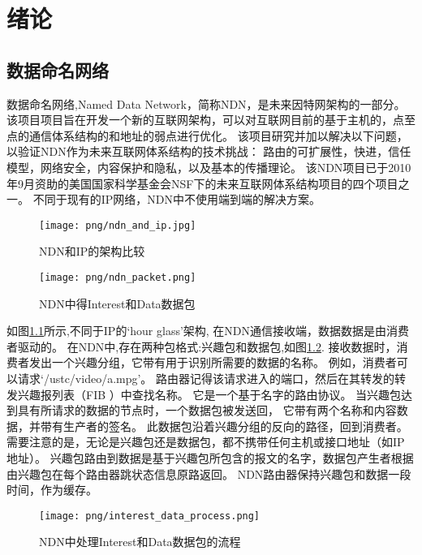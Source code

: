 
\chapter{绪论}

\section{数据命名网络}

数据命名网络,Named Data Network\cite{zhang2010named}，简称NDN，是未来因特网架构的一部分。
该项目项目旨在开发一个新的互联网架构，可以对互联网目前的基于主机的，点至点的通信体系结构的和地址的弱点进行优化。
该项目研究并加以解决以下问题，以验证NDN作为未来互联网体系结构的技术挑战：
路由的可扩展性，快进，信任模型，网络安全，内容保护和隐私，以及基本的传播理论。
该NDN项目已于2010年9月资助的美国国家科学基金会NSF下的未来互联网体系结构项目的四个项目之一。
不同于现有的IP网络，NDN中不使用端到端的解决方案。


\begin{figure}
\centering
\texttt{[image: png/ndn\_and\_ip.jpg]}
\caption{NDN和IP的架构比较}
\label{fig:hour_glass}
\end{figure}

\begin{figure}[]
\centering
\texttt{[image: png/ndn\_packet.png]}
\caption{NDN中得Interest和Data数据包}
\label{fig:interest_data}
\end{figure}

如图\ref{fig:hour_glass}所示,不同于IP的`hour glass'架构,
在NDN通信接收端，数据数据是由消费者驱动的。
在NDN中,存在两种包格式:兴趣包和数据包,如图\ref{fig:interest_data}.
接收数据时，消费者发出一个兴趣分组，它带有用于识别所需要的数据的名称。
例如，消费者可以请求`/ustc/video/a.mpg'。
路由器记得该请求进入的端口，然后在其转发的转发兴趣报列表（FIB ）中查找名称。
它是一个基于名字的路由协议。
当兴趣包达到具有所请求的数据的节点时，一个数据包被发送回，
它带有两个名称和内容数据，并带有生产者的签名。
此数据包沿着兴趣分组的反向的路径，回到消费者。
需要注意的是，无论是兴趣包还是数据包，都不携带任何主机或接口地址（如IP地址）。
兴趣包路由到数据是基于兴趣包所包含的报文的名字，数据包产生者根据由兴趣包在每个路由器跳状态信息原路返回。
NDN路由器保持兴趣包和数据一段时间，作为缓存。

\begin{figure}
\centering
\texttt{[image: png/interest\_data\_process.png]}
\caption{NDN中处理Interest和Data数据包的流程}
\label{fig:ndn_process}
\end{figure}

